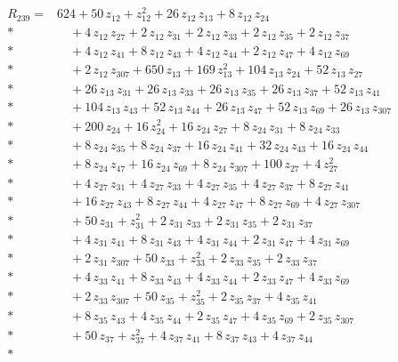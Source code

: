 \documentclass[10pt]{article}
\begin{document}
\begin{align*}
R_{239}={}& 624 + 50\,z_{12} + z_{12}^{2} + 26\,z_{12}\,z_{13} + 8\,z_{12}\,z_{24} \\*
&\quad + 4\,z_{12}\,z_{27} + 2\,z_{12}\,z_{31} + 2\,z_{12}\,z_{33} + 2\,z_{12}\,z_{35} + 2\,z_{12}\,z_{37} \\*
&\quad + 4\,z_{12}\,z_{41} + 8\,z_{12}\,z_{43} + 4\,z_{12}\,z_{44} + 2\,z_{12}\,z_{47} + 4\,z_{12}\,z_{69} \\*
&\quad + 2\,z_{12}\,z_{307} + 650\,z_{13} + 169\,z_{13}^{2} + 104\,z_{13}\,z_{24} + 52\,z_{13}\,z_{27} \\*
&\quad + 26\,z_{13}\,z_{31} + 26\,z_{13}\,z_{33} + 26\,z_{13}\,z_{35} + 26\,z_{13}\,z_{37} + 52\,z_{13}\,z_{41} \\*
&\quad + 104\,z_{13}\,z_{43} + 52\,z_{13}\,z_{44} + 26\,z_{13}\,z_{47} + 52\,z_{13}\,z_{69} + 26\,z_{13}\,z_{307} \\*
&\quad + 200\,z_{24} + 16\,z_{24}^{2} + 16\,z_{24}\,z_{27} + 8\,z_{24}\,z_{31} + 8\,z_{24}\,z_{33} \\*
&\quad + 8\,z_{24}\,z_{35} + 8\,z_{24}\,z_{37} + 16\,z_{24}\,z_{41} + 32\,z_{24}\,z_{43} + 16\,z_{24}\,z_{44} \\*
&\quad + 8\,z_{24}\,z_{47} + 16\,z_{24}\,z_{69} + 8\,z_{24}\,z_{307} + 100\,z_{27} + 4\,z_{27}^{2} \\*
&\quad + 4\,z_{27}\,z_{31} + 4\,z_{27}\,z_{33} + 4\,z_{27}\,z_{35} + 4\,z_{27}\,z_{37} + 8\,z_{27}\,z_{41} \\*
&\quad + 16\,z_{27}\,z_{43} + 8\,z_{27}\,z_{44} + 4\,z_{27}\,z_{47} + 8\,z_{27}\,z_{69} + 4\,z_{27}\,z_{307} \\*
&\quad + 50\,z_{31} + z_{31}^{2} + 2\,z_{31}\,z_{33} + 2\,z_{31}\,z_{35} + 2\,z_{31}\,z_{37} \\*
&\quad + 4\,z_{31}\,z_{41} + 8\,z_{31}\,z_{43} + 4\,z_{31}\,z_{44} + 2\,z_{31}\,z_{47} + 4\,z_{31}\,z_{69} \\*
&\quad + 2\,z_{31}\,z_{307} + 50\,z_{33} + z_{33}^{2} + 2\,z_{33}\,z_{35} + 2\,z_{33}\,z_{37} \\*
&\quad + 4\,z_{33}\,z_{41} + 8\,z_{33}\,z_{43} + 4\,z_{33}\,z_{44} + 2\,z_{33}\,z_{47} + 4\,z_{33}\,z_{69} \\*
&\quad + 2\,z_{33}\,z_{307} + 50\,z_{35} + z_{35}^{2} + 2\,z_{35}\,z_{37} + 4\,z_{35}\,z_{41} \\*
&\quad + 8\,z_{35}\,z_{43} + 4\,z_{35}\,z_{44} + 2\,z_{35}\,z_{47} + 4\,z_{35}\,z_{69} + 2\,z_{35}\,z_{307} \\*
&\quad + 50\,z_{37} + z_{37}^{2} + 4\,z_{37}\,z_{41} + 8\,z_{37}\,z_{43} + 4\,z_{37}\,z_{44} \\*

\end{align*}
\end{document}
